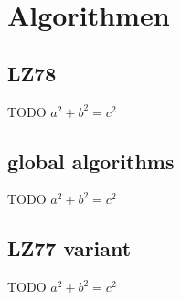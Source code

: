 \documentclass[xcolor=dvipsnames]{beamer}
\begin{document}
\section{Algorithmen}

\subsection{LZ78}
\begin{frame}{\FrameName}
	\begin{block}{TODO}
	\Gap
	$a^2 + b^2 = c^2$
\end{block}
\end{frame}

\subsection{global algorithms}
\begin{frame}{\FrameName}
	\begin{block}{TODO}
	\Gap
	$a^2 + b^2 = c^2$
\end{block}
\end{frame}

\subsection{LZ77 variant}
\begin{frame}{\FrameName}
	\begin{block}{TODO}
	\Gap
	$a^2 + b^2 = c^2$
\end{block}
\end{frame}
\end{document}
